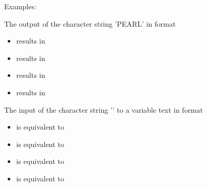 Examples:

The output of the character string 'PEARL' in format

\begin{itemize}
\item {}    results in  
\item {} results in  
\item {} results in 
\item {} results in 
\end{itemize}

The input of the character string '' to a 
 variable text in format

\begin{itemize}
\item {} is equivalent to 
\item {} is equivalent to 
\item {} is equivalent to 
\item {} is equivalent to 
\end{itemize}



